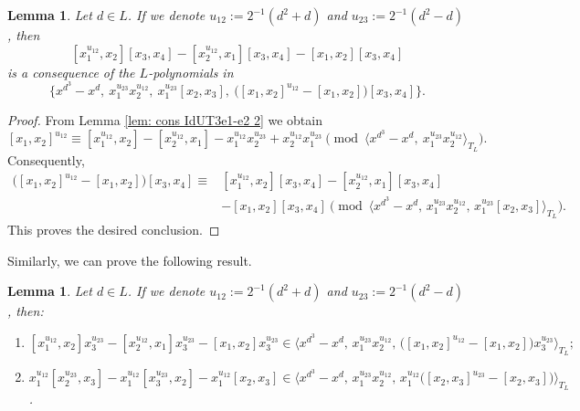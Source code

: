 \documentclass[a4paper,reqno]{amsart}
\newtheorem{lemma}[theorem]{Lemma}
\theoremstyle{definition}
\numberwithin{equation}{section}
\numberwithin{theorem}{section}
\begin{document}
\begin{lemma}\label{lem: cons IdUT3e1-e2 5}
    Let $d\in L$. If we denote $u_{12}:=2^{-1}(d^2+d)$ and $u_{23}:=2^{-1}(d^2-d)$, then
     $$
 [x_1^{u_{12}},x_2] [x_3,x_4] - [x_2^{u_{12}},x_1] [x_3,x_4]-[x_1,x_2][x_3,x_4]
$$
is a consequence of the $L$-polynomials in $$\bigl\{x^{d^3}-x^{d}, \ x_1^{u_{23}}x_2^{u_{12}}, \ x_1^{u_{23}}[x_2,x_3],\ \big([x_1,x_2]^{u_{12}}-[x_1,x_2]\big)[x_3,x_4]\bigr\}.$$
\end{lemma}
\begin{proof}
From Lemma \ref{lem: cons IdUT3e1-e2 2} we obtain
$$
[x_1,x_2]^{u_{12}}\equiv [x_1^{u_{12}},x_2] - [x_2^{u_{12}},x_1]-x_1^{u_{12}} x_2^{u_{23}} + x_2^{u_{12}} x_1^{u_{23}} \pmod{\langle x^{d^3}-x^{d}, \ x_1^{u_{23}}x_2^{u_{12}} \rangle_{T_L}}.
$$
Consequently,
\begin{align*}
    \big([x_1,x_2]^{u_{12}}-[x_1,x_2]\big)[x_3,x_4]\equiv & [x_1^{u_{12}},x_2] [x_3,x_4] - [x_2^{u_{12}},x_1] [x_3,x_4]
    \\
    &-[x_1,x_2][x_3,x_4] \pmod{\langle x^{d^3}-x^{d}, \, x_1^{u_{23}}x_2^{u_{12}},\, x_1^{u_{23}}[x_2,x_3]\rangle_{T_L}}.
\end{align*}
    This proves the desired conclusion.
\end{proof}

Similarly, we can prove the following result.
\begin{lemma} \label{lem: cons IdUT3e1-e2 u_12 u_23}
     Let $d\in L$. If we denote $u_{12}:=2^{-1}(d^2+d)$ and $u_{23}:=2^{-1}(d^2-d)$, then:
     \begin{enumerate}
         \item $
 [x_1^{u_{12}},x_2] x_3^{u_{23}} - [x_2^{u_{12}},x_1] x_3^{u_{23}} -[x_1,x_2]x_3^{u_{23}} \in \langle x^{d^3}-x^{d}, \, x_1^{u_{23}}x_2^{u_{12}} , \, \big([x_1,x_2]^{u_{12}}-[x_1,x_2]\big) x_3^{u_{23}} \rangle_{T_L};
$
         \vspace{1mm}
         \item $ x_1^{u_{12}} [x_2^{u_{23}},x_3] - x_1^{u_{12}} [x_3^{u_{23}},x_2]-x_1^{u_{12}} [x_2,x_3]  \in \langle x^{d^3}-x^{d}, \, x_1^{u_{23}}x_2^{u_{12}} , \,   x_1^{u_{12}} \big([x_2,x_3]^{u_{23}}-[x_2,x_3]\big)\rangle_{T_L}$.
     \end{enumerate}
\end{lemma}
\end{document}

